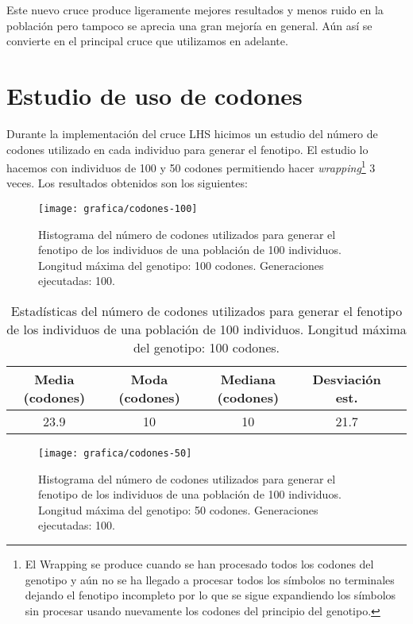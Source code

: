 Este nuevo cruce produce ligeramente mejores resultados y menos ruido en la población pero tampoco se aprecia una gran mejoría en general. Aún así se convierte en el principal cruce que utilizamos en adelante.

\section{Estudio de uso de codones}
Durante la implementación del cruce LHS hicimos un estudio del número de codones utilizado en cada individuo para generar el fenotipo. El estudio lo hacemos con individuos de 100 y 50 codones permitiendo hacer \textit{wrapping}\footnote{El Wrapping se produce cuando se han procesado todos los codones del genotipo y aún no se ha llegado a procesar todos los símbolos no terminales dejando el fenotipo incompleto por lo que se sigue expandiendo los símbolos sin procesar usando nuevamente los codones del principio del genotipo.} 3 veces.  Los resultados obtenidos son los siguientes:
\begin{figure}[H]
\centering
\texttt{[image: grafica/codones-100]}
\caption{Histograma del número de codones utilizados para generar el fenotipo de los individuos de una población de 100 individuos. Longitud máxima del genotipo: 100 codones. Generaciones ejecutadas: 100.}
\end{figure}

\begin{table}[H]
\centering
\begin{tabular}{|c|c|c|c|c|}
\hline
\textbf{Media (codones)} & \textbf{Moda (codones)} & \textbf{Mediana (codones)} & \textbf{Desviación  est.} \\ \hline
23.9           & 10            & 10               & 21.7                      \\ \hline
\end{tabular}
\caption{Estadísticas del número de codones utilizados para generar el fenotipo de los individuos de una población de 100 individuos. Longitud máxima del genotipo: 100 codones.}
\end{table}

\begin{figure}[H]
\centering
\texttt{[image: grafica/codones-50]}
\caption{Histograma del número de codones utilizados para generar el fenotipo de los individuos de una población de 100 individuos. Longitud máxima del genotipo: 50 codones. Generaciones ejecutadas: 100.}
\end{figure}

